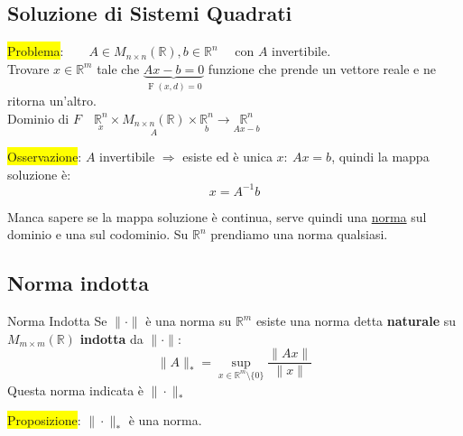 \documentclass{article}
\begin{document}
\subsection{Soluzione di Sistemi Quadrati}
\colorbox{yellow}{Problema}:\(\qquad A\in M_{n\times n}(\mathbb{R}),b\in\mathbb{R}^n \quad\) con $A$ invertibile.\\
Trovare $x\in\mathbb{R}^m$ tale che $\underbrace{Ax - b=0}_{\operatorname{F}(x,d)=0}$ funzione che prende un vettore reale e ne ritorna un'altro.\\
Dominio di $F\quad \underset{x}{\mathbb{R}^n}\times \underset{A}{M_{n\times n}(\mathbb{R})}\times \underset{b}{\mathbb{R}^n}\to \underset{Ax-b}{\mathbb{R}^n}$

\colorbox{yellow}{Osservazione}: $A$ invertibile $\Rightarrow$ esiste ed è unica $x:\ Ax=b$, quindi la mappa soluzione è:
\[x=A^{-1}b\]

Manca sapere se la mappa soluzione è continua, serve quindi una \underline{norma} sul dominio e una sul codominio.
Su $\mathbb{R}^n$ prendiamo una norma qualsiasi.

\subsection{Norma indotta}
\begin{defi}{Norma Indotta}{}
    Se $\|\cdot\|$ è una norma su $\mathbb{R}^m$ esiste una norma detta \textbf{naturale} su $M_{m\times m}(\mathbb{R})$ \textbf{indotta}
    da $\|\cdot\|$: \[\|A\|_*=\sup_{x\in\mathbb R^m\setminus\{0\}}\frac{\|Ax\|}{\|x\|}\]
    Questa norma indicata è $\|\cdot\|_*$
\end{defi}

\colorbox{yellow}{Proposizione}: $\|\cdot\|_*$ è una norma.
\end{document}
